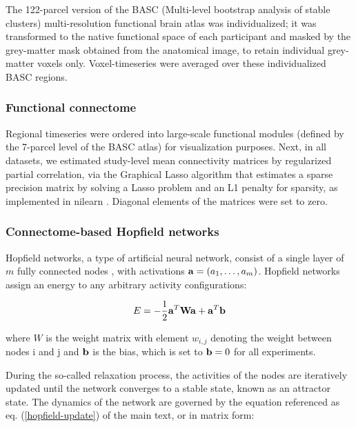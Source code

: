 \documentclass{article}
\begin{document}
The 122-parcel version of the BASC (Multi-level bootstrap analysis of stable clusters) multi-resolution functional brain atlas \citep{bellec2010multi} was individualized; it was transformed to the native functional space of each participant and masked by the  grey-matter mask obtained from the anatomical image, to retain individual grey-matter voxels only. Voxel-timeseries were averaged over these individualized BASC regions.

\subsubsection{Functional connectome}

Regional timeseries were ordered into large-scale functional modules (defined by the 7-parcel level of the BASC atlas) for visualization purposes.
Next, in all datasets, we estimated study-level mean connectivity matrices by regularized partial correlation, via the Graphical Lasso algorithm that estimates a sparse precision matrix by solving a Lasso problem and an L1 penalty for sparsity, as implemented in nilearn \citep{abraham2014machine}. Diagonal elements of the matrices were set to zero.

\subsubsection{Connectome-based Hopfield networks}

Hopfield networks, a type of artificial neural network, consist of a single layer of $m$ fully connected nodes \citep{hopfield1982neural}, with activations $\bold{a} = (a_1, \dots, a_m )$. Hopfield networks assign an energy to any arbitrary activity configurations:

\begin{equation}
\label{energy-function}
E = - \frac{1}{2}  \bold{a}^{T} \bold{W} \bold{a} + \bold{a}^{T}\bold{b}
\end{equation}

where $W$ is the weight matrix with element $w_{i,j}$ denoting the weight between nodes i and j and $\bold{b}$ is the bias, which is set to $\bold{b} = 0$ for all experiments.

During the so-called relaxation process, the activities of the nodes are iteratively updated until the network converges to a stable state, known as an attractor state. The dynamics of the network are governed by the equation referenced as eq. (\ref{hopfield-update}) of the main text, or in matrix form:
\end{document}
